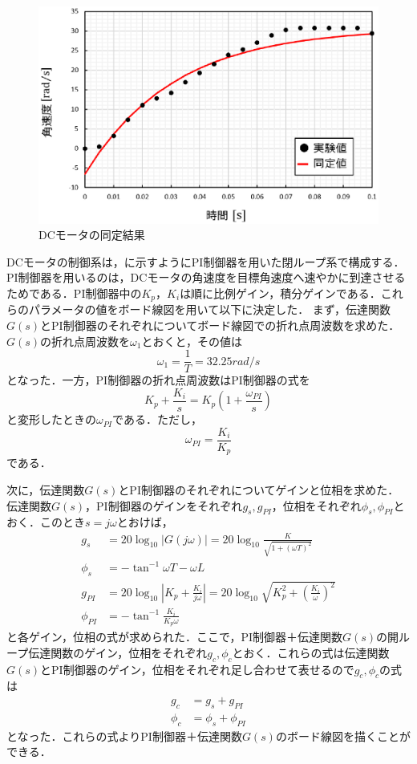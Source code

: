 \begin{figure}[htb]
  \centering
    \includegraphics[width=0.7\hsize]{picture/eps/dcmotor_doutei.eps}
  \caption{DCモータの同定結果}
  \label{fig::dcmotor_doutei}
  
\end{figure}

  
  DCモータの制御系は，に示すようにPI制御器を用いた閉ループ系で構成する．PI制御器を用いるのは，DCモータの角速度を目標角速度へ速やかに到達させるためである．PI制御器中の$K_{p}$，$K_{i}$は順に比例ゲイン，積分ゲインである．これらのパラメータの値をボード線図を用いて以下に決定した．
  まず，伝達関数$G(s)$とPI制御器のそれぞれについてボード線図での折れ点周波数を求めた．$G(s)$の折れ点周波数を$\omega_{1}$とおくと，その値は  
\begin{equation}
 \omega_{1}=\frac{1}{T}=32.25\unit{rad/s}
\end{equation}
となった．一方，PI制御器の折れ点周波数はPI制御器の式を
\begin{equation}
 K_{p}+\frac{K_{i}}{s}=K_{p}(1+\frac{\omega_{PI}}{s})
\end{equation}
と変形したときの$\omega_{PI}$である．ただし，
\begin{equation}
 \omega_{PI}=\frac{K_{i}}{K_{p}}\label{eq::omega_PI}
\end{equation}
である．

次に，伝達関数$G(s)$とPI制御器のそれぞれについてゲインと位相を求めた．
伝達関数$G(s)$，PI制御器のゲインをそれぞれ$g_{s},g_{PI}$，位相をそれぞれ$\phi_{s},\phi_{PI}$とおく．このとき$s=j\omega$とおけば，
\begin{align}
 g_{s}&=20\log_{10}{|G(j\omega)|}=20\log_{10}{\frac{K}{\sqrt{1+(\omega T)^{2}}}} \\
 \phi_{s}&=-\tan^{-1}{\omega T}-\omega L \\
 g_{PI}&=20\log_{10}{|K_{p}+\frac{K_{i}}{j\omega}|}=20\log_{10}{\sqrt{K_{p}^{2}+(\frac{K_{i}}{\omega})^{2}}} \\
 \phi_{PI}&=-\tan^{-1}{\frac{K_{i}}{K_{p}\omega}}
\end{align}
と各ゲイン，位相の式が求められた．ここで，PI制御器＋伝達関数$G(s)$の開ループ伝達関数のゲイン，位相をそれぞれ$g_{c},\phi_{c}$とおく．これらの式は伝達関数$G(s)$とPI制御器のゲイン，位相をそれぞれ足し合わせて表せるので$g_{c},\phi_{c}$の式は
\begin{align}
 g_{c}&=g_{s}+g_{PI}\\
 \phi_{c}&=\phi_{s}+\phi_{PI}
\end{align}
となった．これらの式よりPI制御器＋伝達関数$G(s)$のボード線図を描くことができる．

